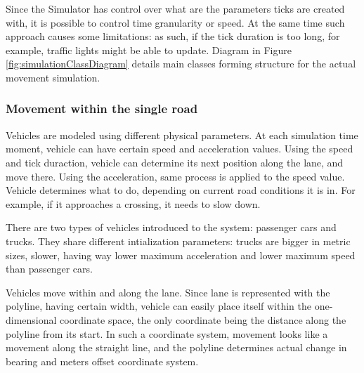 Since the Simulator has control over what are the parameters ticks are created with, it is possible to control time granularity or speed. At the same time such approach causes some limitations: as such, if the tick duration is too long, for example, traffic lights might be able to update.
Diagram in Figure \ref{fig:simulationClassDiagram} details main classes forming structure for the actual movement simulation.

\subsubsection{Movement within the single road}
Vehicles are modeled using different physical parameters. At each simulation time moment, vehicle can have certain speed and acceleration values. Using the speed and tick duraction, vehicle can determine its next position along the lane, and move there. Using the acceleration, same process is applied to the speed value. Vehicle determines what to do, depending on current road conditions it is in. For example, if it approaches a crossing, it needs to slow down.

There are two types of vehicles introduced to the system: passenger cars and trucks. They share different intialization parameters: trucks are bigger in metric sizes, slower, having way lower maximum acceleration and lower maximum speed than passenger cars.

Vehicles move within and along the lane. Since lane is represented with the polyline, having certain width, vehicle can easily place itself within the one-dimensional coordinate space, the only coordinate being the distance along the polyline from its start. In such a coordinate system, movement looks like a movement along the straight line, and the polyline determines actual change in bearing and meters offset coordinate system.

